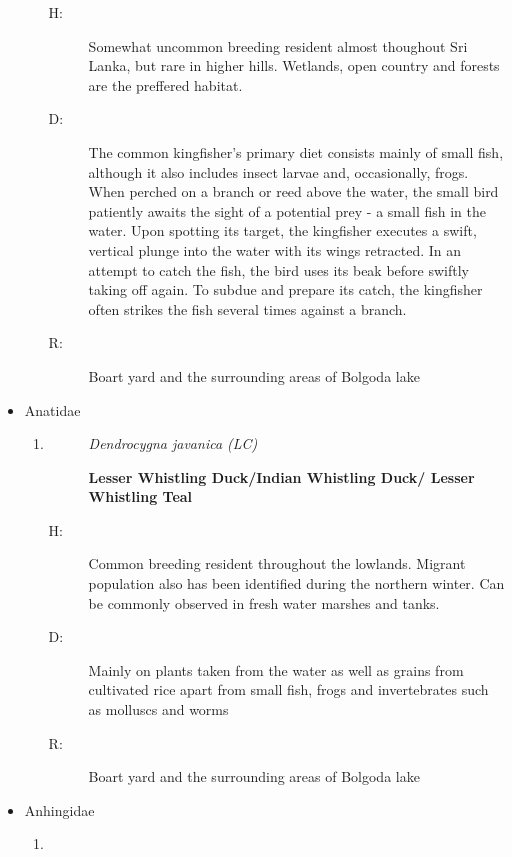 \begin{itemize}
\begin{enumerate}
\begin{description}
\end{description}%
\begin{description}%
\item[H: ]%
Somewhat uncommon breeding resident almost thoughout Sri Lanka, but rare in higher hills. Wetlands, open country and forests are the preffered habitat.%
\item[D: ]%
The common kingfisher's primary diet consists mainly of small fish, although it also includes insect larvae and, occasionally, frogs. When perched on a branch or reed above the water, the small bird patiently awaits the sight of a potential prey {-} a small fish in the water. Upon spotting its target, the kingfisher executes a swift, vertical plunge into the water with its wings retracted. In an attempt to catch the fish, the bird uses its beak before swiftly taking off again. To subdue and prepare its catch, the kingfisher often strikes the fish several times against a branch.%
\item[R: ]%
Boart yard and the surrounding areas of Bolgoda lake%
\end{description}%
\end{enumerate}%
\item%
Anatidae%
\begin{enumerate}%
\item%
\begin{description}%
\item[]%
\textit{Dendrocygna javanica (LC)}%
\item[]%
\textbf{Lesser Whistling Duck/Indian Whistling Duck/ Lesser Whistling Teal}%
\end{description}%
\begin{description}%
\item[H: ]%
Common breeding resident throughout the lowlands. Migrant population also has been identified during the northern winter. Can be commonly observed in fresh water marshes and tanks.%
\item[D: ]%
Mainly on plants taken from the water as well as grains from cultivated rice apart from small fish, frogs and invertebrates such as molluscs and worms%
\item[R: ]%
Boart yard and the surrounding areas of Bolgoda lake%
\end{description}%
\end{enumerate}%
\item%
Anhingidae%
\begin{enumerate}%
\item%
\begin{description}%

\end{description}
\end{enumerate}
\end{itemize}

